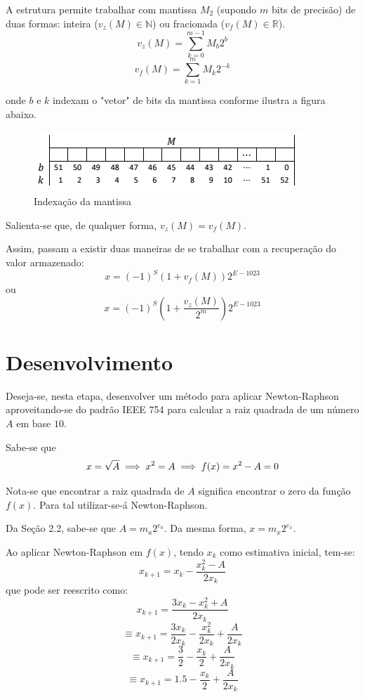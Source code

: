 	A estrutura permite trabalhar com mantissa $M_2$ (supondo $m$ bits de precisão) de duas formas: inteira ($v_z(M) \in \mathbb{N}$) ou fracionada ($v_f(M) \in \mathbb{R}$).
	$$v_z(M) = \sum_{k=0}^{m-1}{M_b2^{b}}$$
	$$v_f(M) = \sum_{k=1}^{m}{M_k2^{-k}}$$

	onde $b$ e $k$ indexam o "vetor" de bits da mantissa conforme ilustra a figura abaixo.
	\begin{figure}[h]
		\centering
		\includegraphics{index_mant}
		\caption{Indexação da mantissa}
		\label{fig:index_mant}
	\end{figure}

	Salienta-se que, de qualquer forma, $v_z(M) = v_f(M)$.

	Assim, passam a existir duas maneiras de se trabalhar com a recuperação do valor armazenado:
	$$x = (-1)^{S}(1 + v_f(M))2^{E - 1023}$$
	ou
	$$x = (-1)^{S}(1 + \frac{v_z(M)}{2^m})2^{E - 1023}$$

	\section{Desenvolvimento}
	\label{sec:desenvolvimento}

	Deseja-se, nesta etapa, desenvolver um método para aplicar Newton-Raphson aproveitando-se do padrão IEEE 754 para calcular a raiz quadrada de um número $A$ em base $10$.

	Sabe-se que
	$$x = \sqrt{A} \implies x^2 = A\\\implies f(x) = x^2 - A = 0$$

	Nota-se que encontrar a raiz quadrada de $A$ significa encontrar o zero da função $f(x)$. Para tal utilizar-se-á Newton-Raphson.

	Da Seção 2.2, sabe-se que $A = m_a2^{e_a}$. Da mesma forma, $x = m_x2^{e_x}$.

	Ao aplicar Newton-Raphson em $f(x)$, tendo $x_k$ como estimativa inicial, tem-se:
	$$x_{k+1} = x_k - \frac{x_k^2 - A}{2x_k}$$
	que pode ser reescrito como:
	$$x_{k+1} = \frac{3x_k - x_k^2 + A}{2x_k}$$
	$$\equiv x_{k+1} = \frac{3x_k}{2x_k} - \frac{x_k^2}{2x_k} + \frac{A}{2x_k}$$
	$$\equiv x_{k+1} = \frac{3}{2} - \frac{x_k}{2} + \frac{A}{2x_k}$$
	$$\equiv x_{k+1} = 1.5 - \frac{x_k}{2} + \frac{A}{2x_k}$$

